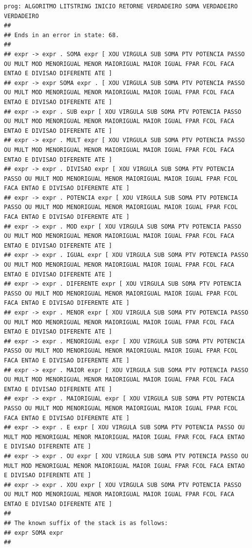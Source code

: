 \documentclass[hidelinks,12pt]{article}
\begin{document}
\begin{lstlisting}
prog: ALGORITMO LITSTRING INICIO RETORNE VERDADEIRO SOMA VERDADEIRO VERDADEIRO 
##
## Ends in an error in state: 68.
##
## expr -> expr . SOMA expr [ XOU VIRGULA SUB SOMA PTV POTENCIA PASSO OU MULT MOD MENORIGUAL MENOR MAIORIGUAL MAIOR IGUAL FPAR FCOL FACA ENTAO E DIVISAO DIFERENTE ATE ]
## expr -> expr SOMA expr . [ XOU VIRGULA SUB SOMA PTV POTENCIA PASSO OU MULT MOD MENORIGUAL MENOR MAIORIGUAL MAIOR IGUAL FPAR FCOL FACA ENTAO E DIVISAO DIFERENTE ATE ]
## expr -> expr . SUB expr [ XOU VIRGULA SUB SOMA PTV POTENCIA PASSO OU MULT MOD MENORIGUAL MENOR MAIORIGUAL MAIOR IGUAL FPAR FCOL FACA ENTAO E DIVISAO DIFERENTE ATE ]
## expr -> expr . MULT expr [ XOU VIRGULA SUB SOMA PTV POTENCIA PASSO OU MULT MOD MENORIGUAL MENOR MAIORIGUAL MAIOR IGUAL FPAR FCOL FACA ENTAO E DIVISAO DIFERENTE ATE ]
## expr -> expr . DIVISAO expr [ XOU VIRGULA SUB SOMA PTV POTENCIA PASSO OU MULT MOD MENORIGUAL MENOR MAIORIGUAL MAIOR IGUAL FPAR FCOL FACA ENTAO E DIVISAO DIFERENTE ATE ]
## expr -> expr . POTENCIA expr [ XOU VIRGULA SUB SOMA PTV POTENCIA PASSO OU MULT MOD MENORIGUAL MENOR MAIORIGUAL MAIOR IGUAL FPAR FCOL FACA ENTAO E DIVISAO DIFERENTE ATE ]
## expr -> expr . MOD expr [ XOU VIRGULA SUB SOMA PTV POTENCIA PASSO OU MULT MOD MENORIGUAL MENOR MAIORIGUAL MAIOR IGUAL FPAR FCOL FACA ENTAO E DIVISAO DIFERENTE ATE ]
## expr -> expr . IGUAL expr [ XOU VIRGULA SUB SOMA PTV POTENCIA PASSO OU MULT MOD MENORIGUAL MENOR MAIORIGUAL MAIOR IGUAL FPAR FCOL FACA ENTAO E DIVISAO DIFERENTE ATE ]
## expr -> expr . DIFERENTE expr [ XOU VIRGULA SUB SOMA PTV POTENCIA PASSO OU MULT MOD MENORIGUAL MENOR MAIORIGUAL MAIOR IGUAL FPAR FCOL FACA ENTAO E DIVISAO DIFERENTE ATE ]
## expr -> expr . MENOR expr [ XOU VIRGULA SUB SOMA PTV POTENCIA PASSO OU MULT MOD MENORIGUAL MENOR MAIORIGUAL MAIOR IGUAL FPAR FCOL FACA ENTAO E DIVISAO DIFERENTE ATE ]
## expr -> expr . MENORIGUAL expr [ XOU VIRGULA SUB SOMA PTV POTENCIA PASSO OU MULT MOD MENORIGUAL MENOR MAIORIGUAL MAIOR IGUAL FPAR FCOL FACA ENTAO E DIVISAO DIFERENTE ATE ]
## expr -> expr . MAIOR expr [ XOU VIRGULA SUB SOMA PTV POTENCIA PASSO OU MULT MOD MENORIGUAL MENOR MAIORIGUAL MAIOR IGUAL FPAR FCOL FACA ENTAO E DIVISAO DIFERENTE ATE ]
## expr -> expr . MAIORIGUAL expr [ XOU VIRGULA SUB SOMA PTV POTENCIA PASSO OU MULT MOD MENORIGUAL MENOR MAIORIGUAL MAIOR IGUAL FPAR FCOL FACA ENTAO E DIVISAO DIFERENTE ATE ]
## expr -> expr . E expr [ XOU VIRGULA SUB SOMA PTV POTENCIA PASSO OU MULT MOD MENORIGUAL MENOR MAIORIGUAL MAIOR IGUAL FPAR FCOL FACA ENTAO E DIVISAO DIFERENTE ATE ]
## expr -> expr . OU expr [ XOU VIRGULA SUB SOMA PTV POTENCIA PASSO OU MULT MOD MENORIGUAL MENOR MAIORIGUAL MAIOR IGUAL FPAR FCOL FACA ENTAO E DIVISAO DIFERENTE ATE ]
## expr -> expr . XOU expr [ XOU VIRGULA SUB SOMA PTV POTENCIA PASSO OU MULT MOD MENORIGUAL MENOR MAIORIGUAL MAIOR IGUAL FPAR FCOL FACA ENTAO E DIVISAO DIFERENTE ATE ]
##
## The known suffix of the stack is as follows:
## expr SOMA expr 
##


\end{lstlisting}
\end{document}

